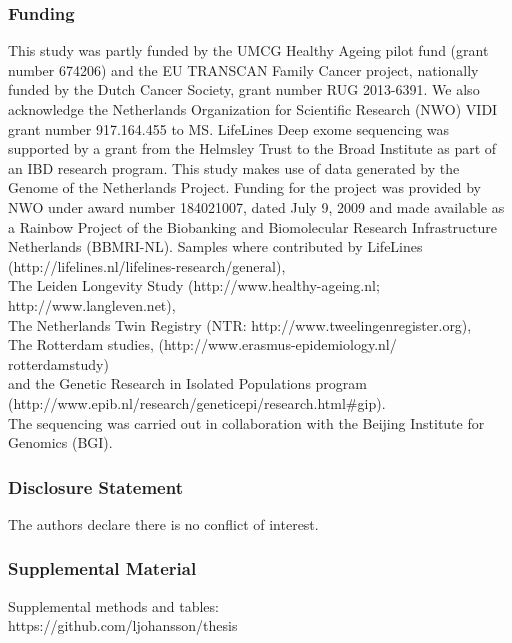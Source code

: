 \subsubsection{Funding}
This study was partly funded by the UMCG Healthy Ageing pilot fund (grant number 674206) and the EU TRANSCAN Family Cancer project, nationally funded by the Dutch Cancer Society, grant number RUG 2013-6391. We also acknowledge the Netherlands Organization for Scientific Research (NWO) VIDI grant number 917.164.455 to MS. LifeLines Deep exome sequencing was supported by a grant from the Helmsley Trust to the Broad Institute as part of an IBD research program. This study makes use of data generated by the Genome of the Netherlands Project. Funding for the project was provided by NWO under award number 184021007, dated July 9, 2009 and made available as a Rainbow Project of the Biobanking and Biomolecular Research Infrastructure Netherlands (BBMRI-NL). Samples where contributed by LifeLines (http://lifelines.nl/lifelines-research/general), \\ The Leiden Longevity Study (http://www.healthy-ageing.nl; \\ http://www.langleven.net), \\ The Netherlands Twin Registry (NTR: http://www.tweelingenregister.org), \\ The Rotterdam studies, (http://www.erasmus-epidemiology.nl/\\rotterdamstudy) \\ and the Genetic Research in Isolated Populations program \\ (http://www.epib.nl/research/geneticepi/research.html\#gip). \\ The sequencing was carried out in collaboration with the Beijing Institute for Genomics (BGI).

\subsubsection{Disclosure Statement} 
The authors declare there is no conflict of interest.

\subsubsection{Supplemental Material}
Supplemental methods and tables:\\ https://github.com/ljohansson/thesis
